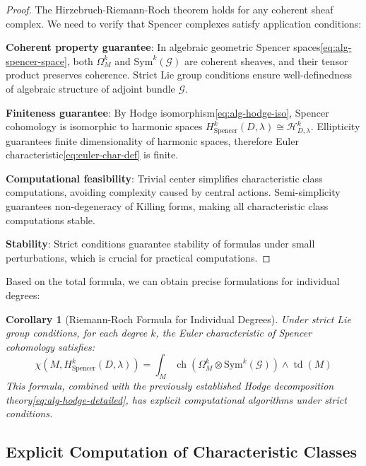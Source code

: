 \documentclass[a4paper,12pt]{extarticle}
\newtheorem{corollary}[theorem]{Corollary}
\newcommand{\ch}{\operatorname{ch}}
\newcommand{\td}{\operatorname{td}}
\theoremstyle{definition}
\begin{document}
\begin{proof}
The Hirzebruch-Riemann-Roch theorem\cite{hirzebruch1966topological} holds for any coherent sheaf complex. We need to verify that Spencer complexes satisfy application conditions:

\textbf{Coherent property guarantee}: In algebraic geometric Spencer spaces\eqref{eq:alg-spencer-space}, both $\Omega^k_M$ and $\mathrm{Sym}^k(\mathcal{G})$ are coherent sheaves, and their tensor product preserves coherence. Strict Lie group conditions ensure well-definedness of algebraic structure of adjoint bundle $\mathcal{G}$.

\textbf{Finiteness guarantee}: By Hodge isomorphism\eqref{eq:alg-hodge-iso}, Spencer cohomology is isomorphic to harmonic spaces $H^k_{\mathrm{Spencer}}(D,\lambda) \cong \mathcal{H}^k_{D,\lambda}$. Ellipticity guarantees finite dimensionality of harmonic spaces, therefore Euler characteristic\eqref{eq:euler-char-def} is finite.

\textbf{Computational feasibility}: Trivial center simplifies characteristic class computations, avoiding complexity caused by central actions. Semi-simplicity guarantees non-degeneracy of Killing forms, making all characteristic class computations stable.

\textbf{Stability}: Strict conditions guarantee stability of formulas under small perturbations, which is crucial for practical computations.
\end{proof}

Based on the total formula, we can obtain precise formulations for individual degrees:

\begin{corollary}[Riemann-Roch Formula for Individual Degrees]
Under strict Lie group conditions, for each degree $k$, the Euler characteristic of Spencer cohomology satisfies:
\begin{equation}\label{eq:individual-riemann-roch}
\chi(M, H^k_{\mathrm{Spencer}}(D,\lambda)) = \int_M \ch(\Omega^k_M \otimes \mathrm{Sym}^k(\mathcal{G})) \wedge \td(M)
\end{equation}
This formula, combined with the previously established Hodge decomposition theory\eqref{eq:alg-hodge-detailed}, has explicit computational algorithms under strict conditions.
\end{corollary}

\subsection{Explicit Computation of Characteristic Classes}
\end{document}
